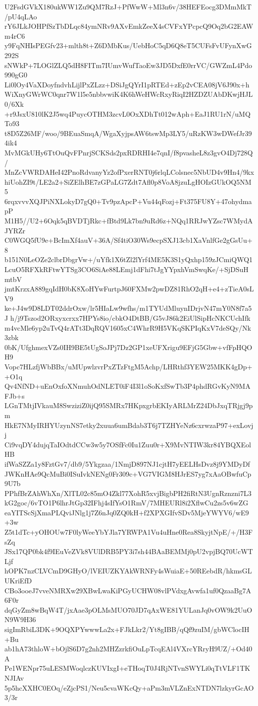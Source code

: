 U2FsdGVkX180ukWW1Zu9QM7RzJ+PfWwW+Ml3n6v/38HEFEocg3DMmMkT/pU4qLAo
rY6JLkJOHPfSzTbDLqc84ymNRv9AXvEmkZeeX4sCVFxYPcpcQ9Oq2bG2EAWm4rC6
y9FqNHIsPEGfv23+mlth8t+Z6DMbKus/UebHoC5qD6Q8eT5CUFsFvUFynXwG292S
sNWkP+7LOGlZLQ5dH8FITm7IUmvWufTaoEw3JD5DxfE0rrVC/GWZmL4Pdo990gG0
Li0lOy4VaXDoyfndvhLijlPxZLzz+DSiJgQYrI1pRTEd+zEp2vCEA08jV6J90x+h
WiXnyGWrWC0qnr7W1l5e5nbbvwiK4K6hWeHWcRxyRiqI2HZDZUAbDKwjHJL0/6Xk
+r9JsxU810lK2J5wq4PuycOTHM3zcvL0OxXDhTt012wAph+EaJ1RU1rN/uMQTo93
t8D5Z26MF/woo/9BEuaSmqA/WgaXyjpsAW6tswMp3LY5/uRzKW3wDWefJr394ik4
MvMGkUHy6TtOuQvFPnrjSCKSds2pxRDRHI4e7qnI/f8pvasheL8z3gvO4Dj728Q/
MnZcVWRDAHeI42PnoRdvanyYz2ofPxerRNT0j6rlqLColsnec5NbUD4v9Hn4/9kx
hiUohZI9t/LE2a2+SiZElhBE7zGPaLG7Zdt7Afl0p8VoA8jzuLgHOIzGUkOQ5NM5
6rqxvvvXQJPiNXLokyD7gQ0+Tv9pzApcP+Vu44qFozj+Ft375FU8Y+47ohydmapP
M1H5//U2+6Oqk5qBVDTjRkc+fBtd9Lk7bn9uRd6z+NQq1RRJwYZsc7WMydAJYRZr
C0WGQ5fU9e+BcImXf4auV+36A/Sf4tiO30Ws9ecpSXJ13cb1XaVnlfGe2gGsUu+8
b151N0LeOZe2clbrDbgrVw+/uYfk1X6tZl2lYrf4ME5K3S1yQxhp159zJCmiQWQ1
LcuO5RFXkRFtwYTSg3CO6SiAe88LEmj1dFhi7tJgYYpxhVmSwqKe/+SjDSuHmtbV
jmtKrzxA889gqIdH0bK8XoHYwFurtpJ60FXMw2pwDZ81RhO2qH+e4+zTieA0sLV9
ke+J4w9D8LDT02ddrOxw/lr5HIaLw9wfhs/m1TYUdMluynIDrjvN47mY0N8f7a5J
h/j9Tszod2ORxyxcrxx7HPYs8io/cbkO4DtBB/G5vJ86k2EiUlSipHcNKCUchIfk
m4vcMle6yp2uTvQ4rATt3DqRQV1605xC4WhrR9H5VKqSKPIqKxV7deSQy/Nk3zbk
0bK/UfghmexVZs0IH9BE5tUgSoJPj7Dz2GP1xeUFXrigu9EFjG5Gbw+vfFpHQOH9
Vopc7HLzfjWbBBx/uMUpwlzvrPxZTzFtgM5Achp/LHRthf3YEW25MKK4gDp++O1q
Qv4NfND+uEnOxfoXNmuhOdNLET0iF4I3l1oSoKxfSwTb3P4phdRGvKyN9MAFJb+s
LGnTMtjIVkauM8SwziziZ0ijQ95SMRx7HKpxgrbEKIyARLMrZ24DbJxqTRjgj9pm
HkE7NMyIRHYUzynNS7etky2xuua6umBdab3T6j7TZHYeNz6cxrwzaP97+exLovjj
Ci9vqDY4dujqTaIOdtdCCw3w5y7OSfFc0Iu1Zuu0r+X9MvNTIW3kr84YBQXEolHB
ifWaSZZa1y8FztGv7/db9/5Ykgzaa/1NmjD897NJ1cjtH7yEELHsDvz8j9YMDyDf
JWKnHAe9QcMuBi0ISuIvkNENg0Fr309c+VG7VIGM8HJrES7yg7xAaOBwfuCp9U7b
PPhfBrZAhWhXn/XlTL02c85mO4Zkl77XohR5xvjBigbPH2fiRtN3UgnRznzni7L3
kG2goc/6vTO1P6lhrJtGp32IFhj4sIfYsO1RmV/7MHEURl8i2XflwCu2zs5v6wZG
eaYITScSjXmaPLQviJNlg1j7Z6nJq0ZQ0kH+f2XPXGIfvSDv5MjeYWYV6/wE9+3w
Z5t1dTc+yOHOUw7F0lyWeeYbYJla7YRWPA1Vu4uHne0Rea8SkyjtNpE/+/H3FsZq
JSx17QP0bk4f9IEuVeZVk8VUlDRB5PY3i7sh44BAaBEMMj0pU2vpjBQ70UcWTLjf
hOPK7nzCLVCmD9GHyO/lVEIUZKYAkWRNFy4sWuiaE+50REebdR/hkmsGLUKriEfD
CBo3ooeJ7vveNMRXw29XBwLwaKiPGyUCHW08vlPVdxgAvwfa1uf0QzaaBg7A6F0r
dqGyZm8wBqW4T/jxAae3pOLMsMUO70JD7qAxWE81YULanJq0vOW9k2UuON9W9H36
sigImRbiL3DK+9OQXPYwwwLa2x+FJkLkr2/Yt8gIBB/qQf9zuIM/gbWClocIH+Bu
ab1hA73thloW+bOjlS6D7g2nh2MHZzrkfiOuLpTcqEAl4VXrcYRryH9UZ/+Od40A
Pe1WENpr75uLESMWoqlczKUVIxgI+eTHoqT0J4RjNTvnSWYLi0qTtVLF1TKNJIAv
5p5hcXXHC0EOq/eZjcPS1/Neu5cvaWKcQy+aPm3mVLZnExNTDN7lzkyrGcAO3/3r
